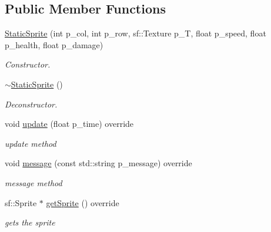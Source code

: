 \subsection*{Public Member Functions}
\begin{DoxyCompactItemize}
\item 
\mbox{\label{class_static_sprite_ace8020b94a9aad1c7ac9928de6a1e495}} 
\mbox{\hyperlink{class_static_sprite_ace8020b94a9aad1c7ac9928de6a1e495}{Static\+Sprite}} (int p\+\_\+col, int p\+\_\+row, sf\+::\+Texture p\+\_\+T, float p\+\_\+speed, float p\+\_\+health, float p\+\_\+damage)
\begin{DoxyCompactList}\small\item\em Constructor. \end{DoxyCompactList}\item 
\mbox{\hyperlink{class_static_sprite_a5e46df96b9b6660764f2b68b82109efc}{$\sim$\+Static\+Sprite}} ()
\begin{DoxyCompactList}\small\item\em Deconstructor. \end{DoxyCompactList}\item 
\mbox{\label{class_static_sprite_a2dd0c3a98082f45d0d77d53d1af13b90}} 
void \mbox{\hyperlink{class_static_sprite_a2dd0c3a98082f45d0d77d53d1af13b90}{update}} (float p\+\_\+time) override
\begin{DoxyCompactList}\small\item\em update method \end{DoxyCompactList}\item 
void \mbox{\hyperlink{class_static_sprite_afe24127ebfb8a93de80fb42729a5f249}{message}} (const std\+::string p\+\_\+message) override
\begin{DoxyCompactList}\small\item\em message method \end{DoxyCompactList}\item 
sf\+::\+Sprite $\ast$ \mbox{\hyperlink{class_static_sprite_a516a9a18b60573cd0b3a5fd6199be0b9}{get\+Sprite}} () override
\begin{DoxyCompactList}\small\item\em gets the sprite \end{DoxyCompactList}\item 
\mbox{\label{class_static_sprite_add5e0038c152e9d7e65afd47ba36abce}} 

\end{DoxyCompactItemize}
